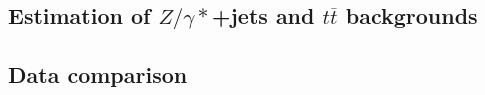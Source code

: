 \subsection{Estimation of \texorpdfstring{$Z/\gamma*$}{Z/y*}+jets and \texorpdfstring{$t\overline{t}$}{tt-bar} backgrounds} \label{sec:ZTTbkg}

\subsection{Data comparison} \label{sec:DataComparison}
